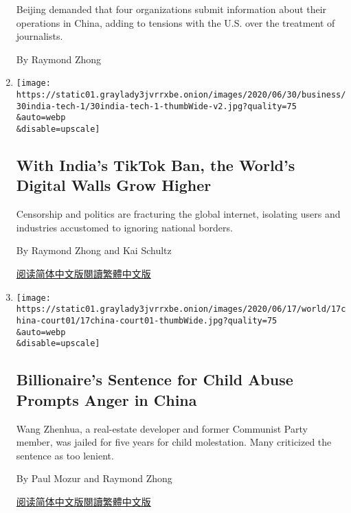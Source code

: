 \begin{enumerate}
  Beijing demanded that four organizations submit information about
  their operations in China, adding to tensions with the U.S. over the
  treatment of journalists.

  By Raymond Zhong
\item
  \href{/2020/06/30/technology/india-china-tiktok.html}{}

  \texttt{[image: https://static01.graylady3jvrrxbe.onion/images/2020/06/30/business/30india-tech-1/30india-tech-1-thumbWide-v2.jpg?quality=75\\\&auto=webp\\\&disable=upscale]}

  \hypertarget{with-indias-tiktok-ban-the-worlds-digital-walls-grow-higher}{%
  \subsection{With India's TikTok Ban, the World's Digital Walls Grow
  Higher}\label{with-indias-tiktok-ban-the-worlds-digital-walls-grow-higher}}

  Censorship and politics are fracturing the global internet, isolating
  users and industries accustomed to ignoring national borders.

  By Raymond Zhong and Kai Schultz

  \href{https://cn.nytimes3xbfgragh.onion/technology/20200701/india-china-tiktok/}{阅读简体中文版}\href{https://cn.nytimes3xbfgragh.onion/technology/20200701/india-china-tiktok/zh-hant/}{閱讀繁體中文版}
\item
  \href{/2020/06/17/world/asia/china-wang-zhenhua-sentence.html}{}

  \texttt{[image: https://static01.graylady3jvrrxbe.onion/images/2020/06/17/world/17china-court01/17china-court01-thumbWide.jpg?quality=75\\\&auto=webp\\\&disable=upscale]}

  \hypertarget{billionaires-sentence-for-child-abuse-prompts-anger-in-china}{%
  \subsection{Billionaire's Sentence for Child Abuse Prompts Anger in
  China}\label{billionaires-sentence-for-child-abuse-prompts-anger-in-china}}

  Wang Zhenhua, a real-estate developer and former Communist Party
  member, was jailed for five years for child molestation. Many
  criticized the sentence as too lenient.

  By Paul Mozur and Raymond Zhong

  \href{https://cn.nytimes3xbfgragh.onion/china/20200618/china-wang-zhenhua-sentence/}{阅读简体中文版}\href{https://cn.nytimes3xbfgragh.onion/china/20200618/china-wang-zhenhua-sentence/z}{閱讀繁體中文版}
\end{enumerate}

